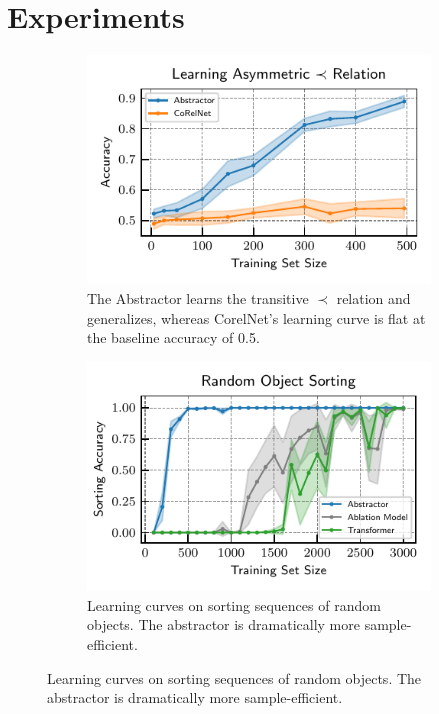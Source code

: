 
\section{Experiments}\label{sec:experiments}

\begin{figure}
    \centering
    \begin{subfigure}[t]{0.45\textwidth}
        \centering
        \includegraphics{figures/experiments/pairwise_order_learning_curves.pdf}
        \caption{The Abstractor learns the transitive $\prec$ relation and generalizes, whereas CorelNet's learning curve is flat at the baseline accuracy of 0.5.}\label{fig:exp_order_relation}
    \end{subfigure} \hspace{\fill}
    \begin{subfigure}[t]{0.45\textwidth}
        \centering
        \includegraphics{figures/experiments/random_object_sorting.pdf}
        \caption{Learning curves on sorting sequences of random objects. The abstractor is dramatically more sample-efficient.}\label{fig:exp_object_sorting}
    \end{subfigure}


\end{figure}
